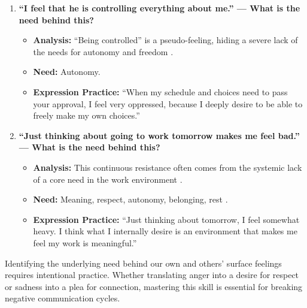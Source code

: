 \begin{enumerate}
    \item \textbf{``I feel that he is controlling everything about me.'' --- What is the need behind this?}
    \begin{itemize}
        \item \textbf{Analysis:} ``Being controlled'' is a pseudo-feeling,
        hiding a severe lack of the needs for autonomy and freedom \citep{thomas1977}.
        \item \textbf{Need:} Autonomy.
        \item \textbf{Expression Practice:} ``When my schedule and choices
        need to pass your approval, I feel very oppressed, because I deeply
        desire to be able to freely make my own choices.''
    \end{itemize}

    \item \textbf{``Just thinking about going to work tomorrow makes me feel bad.'' --- What is the need behind this?}
    \begin{itemize}
        \item \textbf{Analysis:} This continuous resistance often comes
        from the systemic lack of a core need in the work environment \citep{lazarus1991}.
        \item \textbf{Need:} Meaning, respect, autonomy, belonging, rest \citep{kabatzinn1990}.
        \item \textbf{Expression Practice:} ``Just thinking about tomorrow,
        I feel somewhat heavy. I think what I internally desire is an
        environment that makes me feel my work is meaningful.''
    \end{itemize}
\end{enumerate}

\begin{keyinsight}
Identifying the underlying need behind our own and others' surface feelings
requires intentional practice.
Whether translating anger into a desire for respect or sadness into a plea
for connection, mastering this skill is essential for breaking negative
communication cycles.
\end{keyinsight}
